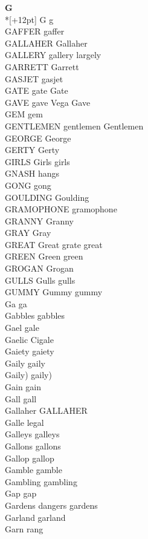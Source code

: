 \vspace{14pt}
\noindent\textbf{\Large G}\\*[+12pt]
G g\\
GAFFER gaffer\\
GALLAHER Gallaher\\
GALLERY gallery largely\\
GARRETT Garrett\\
GASJET gasjet\\
GATE gate Gate\\
GAVE gave Vega Gave\\
GEM gem\\
GENTLEMEN gentlemen Gentlemen\\
GEORGE George\\
GERTY Gerty\\
GIRLS Girls girls\\
GNASH hangs\\
GONG gong\\
GOULDING Goulding\\
GRAMOPHONE gramophone\\
GRANNY Granny\\
GRAY Gray\\
GREAT Great grate great\\
GREEN Green green\\
GROGAN Grogan\\
GULLS Gulls gulls\\
GUMMY Gummy gummy\\
Ga ga\\
Gabbles gabbles\\
Gael gale\\
Gaelic Cigale\\
Gaiety gaiety\\
Gaily gaily\\
Gaily) gaily)\\
Gain gain\\
Gall gall\\
Gallaher GALLAHER\\
Galle legal\\
Galleys galleys\\
Gallons gallons\\
Gallop gallop\\
Gamble gamble\\
Gambling gambling\\
Gap gap\\
Gardens dangers gardens\\
Garland garland\\
Garn rang\\
